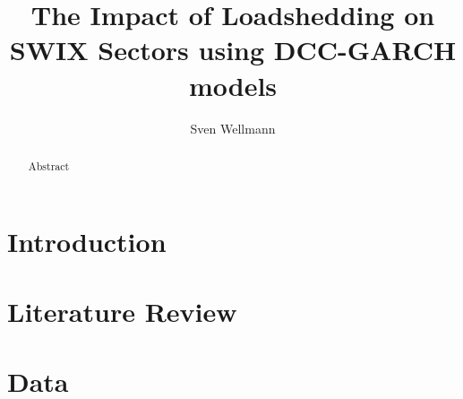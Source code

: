 \documentclass[11pt,preprint, authoryear]{elsarticle}
\numberwithin{equation}{section}
\numberwithin{figure}{section}
\numberwithin{table}{section}
\begin{document}
\begin{frontmatter}  %

\title{The Impact of Loadshedding on SWIX Sectors using DCC-GARCH
models}





\author[Add1]{Sven Wellmann}





\address[Add1]{Stellenbosch University, Stellenbosch, South Africa}


\begin{abstract}
\small{
Abstract
}
\end{abstract}

\vspace{1cm}





\vspace{0.5cm}

\end{frontmatter}



\pagestyle{fancy}
\chead{}
\rhead{}
\lfoot{}
\lhead{}
\cfoot{}


\headsep 35pt %




\hypertarget{introduction}{%
\section{\texorpdfstring{Introduction
\label{Introduction}}{Introduction }}\label{introduction}}

\hypertarget{literature-review}{%
\section{Literature Review}\label{literature-review}}

\hypertarget{data}{%
\section{\texorpdfstring{Data \label{Data}}{Data }}\label{data}}
\end{document}
